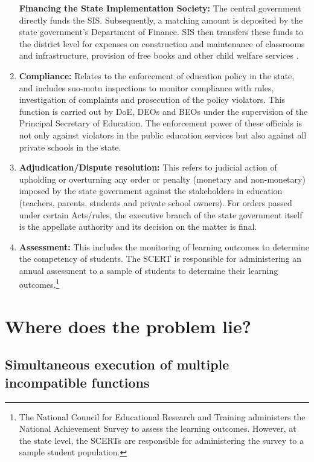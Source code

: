 \documentclass[a4paper, 12pt, twoside]{article}
\begin{document}
\begin{enumerate}
\textbf{Financing the State Implementation Society:} The central government directly funds the SIS. Subsequently, a matching amount is deposited by the state government’s Department of Finance. SIS then transfers these funds to the district level for expenses on construction and maintenance of classrooms and infrastructure, provision of free books and other child welfare services \parencite{ssa_css}. 
\item \textbf{Compliance:} Relates to the enforcement of education policy in the state, and includes suo-motu inspections to monitor compliance with rules, investigation of complaints and prosecution of the policy violators. This function is carried out by DoE, DEOs and BEOs under the supervision of the  Principal Secretary of Education. The enforcement power of these officials is not only against violators in the public education services but also against all private schools in the state.
\item \textbf{Adjudication/Dispute resolution:} This refers to judicial action of upholding or overturning any order or penalty (monetary and non-monetary) imposed by the state government against the stakeholders in education (teachers, parents, students and private school owners). For orders passed under certain Acts/rules, the executive branch of the state government itself is the appellate authority and its decision on the matter is final.
\item \textbf{Assessment:} This includes the monitoring of learning outcomes to determine the competency of students. The SCERT is responsible for administering an annual assessment to a sample of students to determine their learning outcomes.\footnote{The National Council for Educational Research and Training administers the National Achievement Survey to assess the learning outcomes. However, at the state level, the SCERTs are responsible for administering the survey to a sample student population.} 

\end{enumerate}

\section*{Where does the problem lie?} 
\subsection*{Simultaneous execution of multiple incompatible functions}
\end{document}

